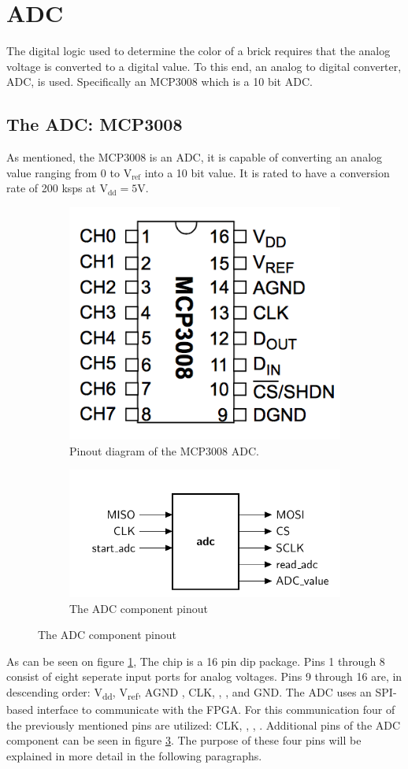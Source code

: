 \section{ADC}
The digital logic used to determine the color of a brick requires that the analog voltage is converted to a digital value. To this end, an analog to digital converter, ADC, is used. Specifically an MCP3008 \cite{mcp3008} which is a 10 bit ADC.
\subsection{The ADC: MCP3008}
As mentioned, the MCP3008 is an ADC, it is capable of converting an analog value ranging from 0 to V$_{\text{ref}}$ into a 10 bit value. It is rated to have a conversion rate of 200 ksps at V$_{\text{dd}} = 5$V. 

\begin{figure}[h!]
	\begin{subfigure}[b]{.48\linewidth}
		\centering
		\includegraphics[width=.5\linewidth]{images/MPC3008.png}
		\caption{Pinout diagram of the MCP3008 ADC.}
		\label{fig:pinout}
	\end{subfigure}
	\begin{subfigure}[b]{.48\linewidth}
		\centering
		\includegraphics[width=\linewidth]{images/ADC_ent}
		\caption{The ADC component pinout}
		\label{fig:adcpinout}
	\end{subfigure}
\end{figure}
As can be seen on figure \ref{fig:pinout}, The chip is a 16 pin dip package. Pins 1 through 8 consist of eight seperate input ports for analog voltages. Pins 9 through 16 are, in descending order: V\textsubscript{dd}, V\textsubscript{ref}, AGND , CLK, \dout,  \din, \cs and GND. 
The ADC uses an SPI-based interface to communicate with the FPGA. 
For this communication four of the previously mentioned pins are utilized: CLK, \cs, \dout, \din. Additional pins of the ADC component can be seen in figure \ref{fig:adcpinout}. 
The purpose of these four pins will be explained in more detail in the following paragraphs.


